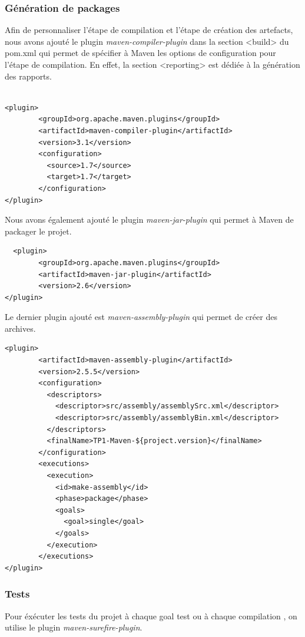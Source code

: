 \documentclass{article}
\begin{document}
\subsubsection{Génération de packages}
Afin de personnaliser l'étape de compilation et l'étape de création des artefacts, nous avons ajouté le plugin \textit{maven-compiler-plugin} dans la section <build> du pom.xml qui permet de spécifier à Maven les options de configuration pour l'étape de compilation. En effet, la section <reporting> est dédiée à la génération des rapports. \\\\
\begin{verbatim}
<plugin>
        <groupId>org.apache.maven.plugins</groupId>
        <artifactId>maven-compiler-plugin</artifactId>
        <version>3.1</version>
        <configuration>
          <source>1.7</source>
          <target>1.7</target>
        </configuration>
</plugin>
\end{verbatim}
Nous avons également ajouté le plugin \textit{maven-jar-plugin} qui permet à Maven de packager le projet.\\
\begin{verbatim}
  <plugin>
        <groupId>org.apache.maven.plugins</groupId>
        <artifactId>maven-jar-plugin</artifactId>
        <version>2.6</version>
</plugin>
\end{verbatim}
Le dernier plugin ajouté est \textit{maven-assembly-plugin} qui permet de créer des archives.
\begin{verbatim}
<plugin>
        <artifactId>maven-assembly-plugin</artifactId>
        <version>2.5.5</version>
        <configuration>
          <descriptors>
            <descriptor>src/assembly/assemblySrc.xml</descriptor>
            <descriptor>src/assembly/assemblyBin.xml</descriptor>
          </descriptors>
          <finalName>TP1-Maven-${project.version}</finalName>
        </configuration>
        <executions>
          <execution>
            <id>make-assembly</id>
            <phase>package</phase>
            <goals>
              <goal>single</goal>
            </goals>
          </execution>
        </executions>
</plugin>
\end{verbatim}
\subsubsection{Tests}
Pour éxécuter les tests du projet à chaque goal test ou à chaque compilation , on utilise le plugin
\textit{maven-surefire-plugin}.
\end{document}
